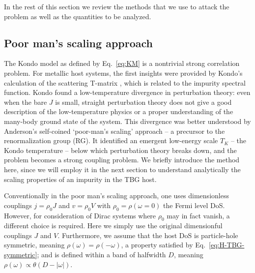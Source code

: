 In the rest of this section we review the methods that we use to attack the problem as well as the quantities to be analyzed. 


\subsection{Poor man's scaling approach}\label{subsec:poorman}

The Kondo model as defined by Eq.~\eqref{eq:KM} is a nontrivial strong correlation problem. For metallic host systems, the first insights were provided by Kondo's calculation of the scattering T-matrix \cite{Kondo1970}, which is related to the impurity spectral function. Kondo found a low-temperature divergence in perturbation theory: even when the bare $J$ is small, straight perturbation theory does not give a good description of the low-temperature physics or a proper understanding of the many-body ground state of the system. This divergence was better understood by Anderson's self-coined `poor-man's scaling' approach \cite{anderson1970poor} -- a precursor to the renormalization group (RG). It identified an emergent low-energy scale $T_K$ -- the Kondo temperature -- below which perturbation theory breaks down, and the problem becomes a strong coupling problem. We briefly introduce the method here, since we will employ it in the next section to understand analytically the scaling properties of an impurity in the TBG host. 

Conventionally in the poor man's scaling approach, one uses dimensionless couplings $j=\rho_0 J$ and $v=\rho_0 V$ with $\rho_0=\rho(\omega=0)$ the Fermi level DoS. However, for consideration of Dirac systems where $\rho_0$ may in fact vanish, a different choice is required. Here we simply use the original dimensionful couplings $J$ and $V$. Furthermore, we assume that the host DoS is particle-hole symmetric, meaning $\rho(\omega)=\rho(-\omega)$, a property satisfied by Eq.~\eqref{eq:H-TBG-symmetric}; and is defined within a band of halfwidth $D$, meaning $\rho(\omega)\propto \theta(D-|\omega|)$.

